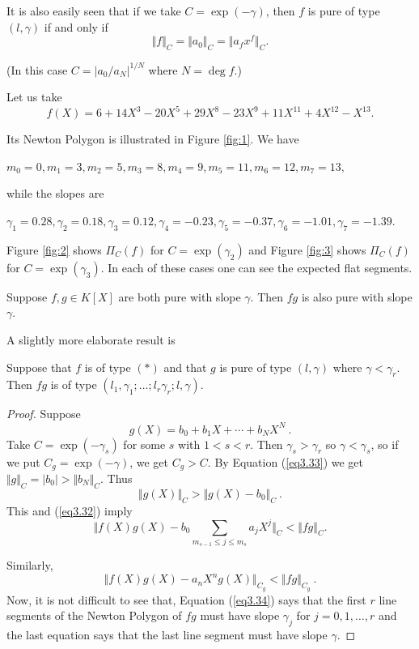 It is also easily seen that if we take $C=\exp(-\gamma)$, then $f$ is pure of type $(l,\gamma)$ if and only if
\begin{equation}
\label{eq3.33}
\Vert f\Vert_{C}=\Vert a_{0}\Vert_{C}=\Vert a_{f}x^{f}\Vert_{C} .
\end{equation}

(In this case $C=|a_{0}/a_{N}|^{1/N}$ where $N=\deg f.$) 

\begin{example}
\label{ex3.2.1}
Let us take
$$f(X)=6+14X^{3}-20X^{5}+29X^{8}-23X^{9}+11X^{11}+4X^{12}-X^{13} .$$

Its Newton Polygon is illustrated in Figure \ref{fig:1}. We have

$m_{0}=0,m_{1}=3,m_{2}=5,m_{3}=8,m_{4}=9,m_{5}=11,m_{6}=12,m_{7}=13,$

while the slopes are

$\gamma_{1}=0.28,\gamma_{2}=0.18,\gamma_{3}=0.12,\gamma_{4}=-0.23,\gamma_{5}=-0.37, \gamma_{6}=-1.01,\gamma_{7}=-1.39.$
\end{example}

Figure \ref{fig:2} shows $\Pi_{C}(f)$ for $C=\exp(\gamma_{2})$ and Figure \ref{fig:3} shows $\Pi_{C}(f)$ for $C= \exp(\gamma_{3})$. In each of these cases one can see the expected flat segments.

\begin{exo}
\label{e3.2.2}
Suppose $f,g\in K[X]$ are both pure with slope $\gamma$. Then $fg$ is also pure with slope $\gamma$.
\end{exo}
A slightly more elaborate result is

\begin{prop}
\label{p3.2.2}
Suppose that $f$ is of type $(*)$ and that $g$ is pure of type $(l,\gamma)$ where $\gamma<\gamma_{r}$. Then $fg$ is of type $(l_{1},\gamma_{1};\ldots;l_{r}\gamma_{r};l,\gamma)$.
\end{prop}

\begin{proof}
Suppose
$$
g(X)=b_{0}+b_{1}X+\cdots+b_{N}X^{N}\ .
$$
Take $C=\exp(-\gamma_{s})$ for some $s$ with $1<s<r$. Then $\gamma_{s}>\gamma_{r}$ so $\gamma<\gamma_{s}$, so if we put $C_{g}=\exp(-\gamma)$, we get $C_{g}>C$. By Equation (\ref{eq3.33}) we get $\Vert g\Vert_{C}=|b_{0}|> \Vert b_{N}\Vert_{C}$. Thus
$$
\Vert g(X)\Vert_{C}>\Vert g(X)-b_{0}\Vert_{C}\ .
$$
This and (\ref{eq3.32}) imply
\begin{equation}
\label{eq3.34}
\Vert f(X)g(X)-b_{0}\sum_{m_{s-1}\leq j\leq m_{s}}a_{j}X^{j}\Vert_{C}<\Vert fg\Vert_{C} .
\end{equation}

Similarly,
$$
\Vert f(X)g(X)-a_{n}X^{n}g(X)\Vert_{C_{g}}<\Vert fg\Vert_{C_{g}}\ .
$$
Now, it is not difficult to see that, Equation (\ref{eq3.34}) says that the first $r$ line segments of the Newton Polygon of $fg$ must have slope $\gamma_{j}$ for $j=0,1,\ldots,r$ and the last equation says that the last line segment must have slope $\gamma$.
\end{proof}

